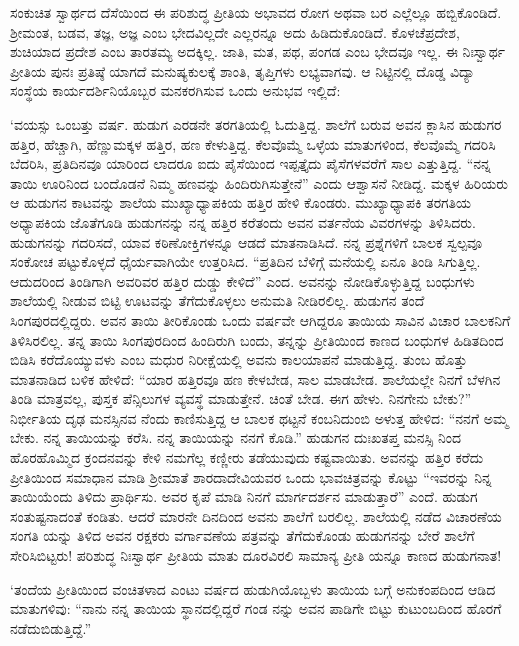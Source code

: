 ಸಂಕುಚಿತ ಸ್ವಾರ್ಥದ ದೆಸೆಯಿಂದ ಈ ಪರಿಶುದ್ಧ ಪ್ರೀತಿಯ ಅಭಾವದ ರೋಗ ಅಥವಾ ಬರ ಎಲ್ಲೆಲ್ಲೂ ಹಬ್ಬಿಕೊಂಡಿದೆ. ಶ‍್ರೀಮಂತ, ಬಡವ, ತಜ್ಞ, ಅಜ್ಞ ಎಂಬ ಭೇದವಿಲ್ಲದೇ ಎಲ್ಲರನ್ನೂ ಅದು ಹಿಡಿದುಕೊಂಡಿದೆ. ಕೊಳಚೆಪ್ರದೇಶ, ಶುಚಿಯಾದ ಪ್ರದೇಶ ಎಂಬ ತಾರತಮ್ಯ ಅದಕ್ಕಿಲ್ಲ. ಜಾತಿ, ಮತ, ಪಥ, ಪಂಗಡ ಎಂಬ ಭೇದವೂ ಇಲ್ಲ. ಈ ನಿಃಸ್ವಾರ್ಥ ಪ್ರೀತಿಯ ಪುನಃ ಪ್ರತಿಷ್ಠೆ ಯಾಗದೆ ಮನುಷ್ಯಕುಲಕ್ಕೆ ಶಾಂತಿ, ತೃಪ್ತಿಗಳು ಲಭ್ಯವಾಗವು. ಆ ನಿಟ್ಟಿನಲ್ಲಿ ದೊಡ್ಡ ವಿದ್ಯಾ ಸಂಸ್ಥೆಯ ಕಾರ್ಯದರ್ಶಿನಿಯೊಬ್ಬರ ಮನಕರಗಿಸುವ ಒಂದು ಅನುಭವ ಇಲ್ಲಿದೆ:

‘ವಯಸ್ಸು ಒಂಬತ್ತು ವರ್ಷ. ಹುಡುಗ ಎರಡನೇ ತರಗತಿಯಲ್ಲಿ ಓದುತ್ತಿದ್ದ. ಶಾಲೆಗೆ ಬರುವ ಅವನ ಕ್ಲಾಸಿನ ಹುಡುಗರ ಹತ್ತಿರ, ಹೆಚ್ಚಾಗಿ, ಹೆಣ್ಣುಮಕ್ಕಳ ಹತ್ತಿರ, ಹಣ ಕೇಳುತ್ತಿದ್ದ. ಕೆಲವೊಮ್ಮೆ ಒಳ್ಳೆಯ ಮಾತುಗಳಿಂದ, ಕೆಲವೊಮ್ಮೆ ಗದರಿಸಿ ಬೆದರಿಸಿ, ಪ್ರತಿದಿನವೂ ಯಾರಿಂದ ಲಾದರೂ ಐದು ಪೈಸೆಯಿಂದ ಇಪ್ಪತ್ತೈದು ಪೈಸೆಗಳವರೆಗೆ ಸಾಲ ಎತ್ತುತ್ತಿದ್ದ. “ನನ್ನ ತಾಯಿ ಊರಿನಿಂದ ಬಂದೊಡನೆ ನಿಮ್ಮ ಹಣವನ್ನು ಹಿಂದಿರುಗಿಸುತ್ತೇನೆ” ಎಂದು ಆಶ್ವಾಸನೆ ನೀಡಿದ್ದ. ಮಕ್ಕಳ ಹಿರಿಯರು ಆ ಹುಡುಗನ ಕಾಟವನ್ನು ಶಾಲೆಯ ಮುಖ್ಯಾಧ್ಯಾಪಕಿಯ ಹತ್ತಿರ ಹೇಳಿ ಕೊಂಡರು. ಮುಖ್ಯಾಧ್ಯಾಪಕಿ ತರಗತಿಯ ಅಧ್ಯಾಪಕಿಯ ಜೊತೆಗೂಡಿ ಹುಡುಗನನ್ನು ನನ್ನ ಹತ್ತಿರ ಕರೆತಂದು ಅವನ ವರ್ತನೆಯ ವಿವರಗಳನ್ನು ತಿಳಿಸಿದರು. ಹುಡುಗನನ್ನು ಗದರಿಸದೆ, ಯಾವ ಕಠಿಣೋಕ್ತಿಗಳನ್ನೂ ಆಡದೆ ಮಾತನಾಡಿಸಿದೆ. ನನ್ನ ಪ್ರಶ್ನೆಗಳಿಗೆ ಬಾಲಕ ಸ್ವಲ್ಪವೂ ಸಂಕೋಚ ಪಟ್ಟುಕೊಳ್ಳದೆ ಧೈರ್ಯವಾಗಿಯೇ ಉತ್ತರಿಸಿದ. “ಪ್ರತಿದಿನ ಬೆಳಿಗ್ಗೆ ಮನೆಯಲ್ಲಿ ಏನೂ ತಿಂಡಿ ಸಿಗುತ್ತಿಲ್ಲ. ಆದುದರಿಂದ ತಿಂಡಿಗಾಗಿ ಅವರಿವರ ಹತ್ತಿರ ದುಡ್ಡು ಕೇಳಿದೆ” ಎಂದ. ಅವನನ್ನು ನೋಡಿಕೊಳ್ಳುತ್ತಿದ್ದ ಬಂಧುಗಳು ಶಾಲೆಯಲ್ಲಿ ನೀಡುವ ಬಿಟ್ಟಿ ಊಟವನ್ನು ತೆಗೆದುಕೊಳ್ಳಲು ಅನುಮತಿ ನೀಡಿರಲಿಲ್ಲ. ಹುಡುಗನ ತಂದೆ ಸಿಂಗಪುರದಲ್ಲಿದ್ದರು. ಅವನ ತಾಯಿ ತೀರಿಕೊಂಡು ಒಂದು ವರ್ಷವೇ ಆಗಿದ್ದರೂ ತಾಯಿಯ ಸಾವಿನ ವಿಚಾರ ಬಾಲಕನಿಗೆ ತಿಳಿಸಿರಲಿಲ್ಲ. ತನ್ನ ತಾಯಿ ಸಿಂಗಪುರದಿಂದ ಹಿಂದಿರುಗಿ ಬಂದು, ತನ್ನನ್ನು ಪ್ರೀತಿಯಿಂದ ಕಾಣದ ಬಂಧುಗಳ ಹಿಡಿತದಿಂದ ಬಿಡಿಸಿ ಕರೆದೊಯ್ಯುವಳು ಎಂಬ ಮಧುರ ನಿರೀಕ್ಷೆಯಲ್ಲಿ ಅವನು ಕಾಲಯಾಪನೆ ಮಾಡುತ್ತಿದ್ದ. ತುಂಬ ಹೊತ್ತು ಮಾತನಾಡಿದ ಬಳಿಕ ಹೇಳಿದೆ: “ಯಾರ ಹತ್ತಿರವೂ ಹಣ ಕೇಳಬೇಡ, ಸಾಲ ಮಾಡಬೇಡ. ಶಾಲೆಯಲ್ಲೇ ನಿನಗೆ ಬೆಳಗಿನ ತಿಂಡಿ ಮಾತ್ರವಲ್ಲ, ಪುಸ್ತಕ ಪೆನ್ಸಿಲುಗಳ ವ್ಯವಸ್ಥೆ ಮಾಡುತ್ತೇನೆ. ಚಿಂತೆ ಬೇಡ. ಈಗ ಹೇಳು. ನಿನಗೇನು ಬೇಕು?” ನಿರ್ಭೀತಿಯ ದೃಢ ಮನಸ್ಸಿನವ ನೆಂದು ಕಾಣಿಸುತ್ತಿದ್ದ ಆ ಬಾಲಕ ಥಟ್ಟನೆ ಕಂಬನಿದುಂಬಿ ಅಳುತ್ತ ಹೇಳಿದ: “ನನಗೆ ಅಮ್ಮ ಬೇಕು. ನನ್ನ ತಾಯಿಯನ್ನು ಕರೆಸಿ. ನನ್ನ ತಾಯಿಯನ್ನು ನನಗೆ ಕೊಡಿ.” ಹುಡುಗನ ದುಃಖತಪ್ತ ಮನಸ್ಸಿ ನಿಂದ ಹೊರಹೊಮ್ಮಿದ ಕ್ರಂದನವನ್ನು ಕೇಳಿ ನಮಗೆಲ್ಲ ಕಣ್ಣೀರು ತಡೆಯುವುದು ಕಷ್ಟವಾಯಿತು. ಅವನನ್ನು ಹತ್ತಿರ ಕರೆದು ಪ್ರೀತಿಯಿಂದ ಸಮಾಧಾನ ಮಾಡಿ ಶ‍್ರೀಮಾತೆ ಶಾರದಾದೇವಿಯವರ ಒಂದು ಭಾವಚಿತ್ರವನ್ನು ಕೊಟ್ಟು “ಇವರನ್ನು ನಿನ್ನ ತಾಯಿಯೆಂದು ತಿಳಿದು ಪ್ರಾರ್ಥಿಸು. ಅವರ ಕೃಪೆ ಮಾಡಿ ನಿನಗೆ ಮಾರ್ಗದರ್ಶನ ಮಾಡುತ್ತಾರೆ” ಎಂದೆ. ಹುಡುಗ ಸಂತುಷ್ಟನಾದಂತೆ ಕಂಡಿತು. ಆದರೆ ಮಾರನೇ ದಿನದಿಂದ ಅವನು ಶಾಲೆಗೆ ಬರಲಿಲ್ಲ. ಶಾಲೆಯಲ್ಲಿ ನಡೆದ ವಿಚಾರಣೆಯ ಸಂಗತಿ ಯನ್ನು ತಿಳಿದ ಅವನ ರಕ್ಷಕರು ವರ್ಗಾವಣೆಯ ಪತ್ರವನ್ನು ತೆಗೆದುಕೊಂಡು ಹುಡುಗನನ್ನು ಬೇರೆ ಶಾಲೆಗೆ ಸೇರಿಸಿಬಿಟ್ಟರು! ಪರಿಶುದ್ಧ ನಿಃಸ್ವಾರ್ಥ ಪ್ರೀತಿಯ ಮಾತು ದೂರವಿರಲಿ ಸಾಮಾನ್ಯ ಪ್ರೀತಿ ಯನ್ನೂ ಕಾಣದ ಹುಡುಗನಾತ!

‘ತಂದೆಯ ಪ್ರೀತಿಯಿಂದ ವಂಚಿತಳಾದ ಎಂಟು ವರ್ಷದ ಹುಡುಗಿಯೊಬ್ಬಳು ತಾಯಿಯ ಬಗ್ಗೆ ಅನುಕಂಪದಿಂದ ಆಡಿದ ಮಾತುಗಳಿವು: “ನಾನು ನನ್ನ ತಾಯಿಯ ಸ್ಥಾನದಲ್ಲಿದ್ದರೆ ಗಂಡ ನನ್ನು ಅವನ ಪಾಡಿಗೇ ಬಿಟ್ಟು ಕುಟುಂಬದಿಂದ ಹೊರಗೆ ನಡೆದುಬಿಡುತ್ತಿದ್ದೆ.”

